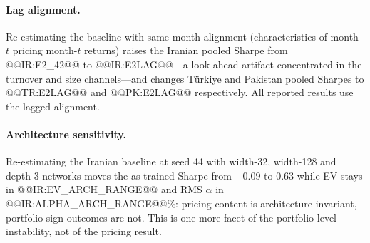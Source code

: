 \documentclass[12pt]{article}
\begin{document}
\paragraph{Lag alignment.} Re-estimating the baseline with same-month alignment (characteristics of month $t$ pricing month-$t$ returns) raises the Iranian pooled Sharpe from @@IR:E2_42@@ to @@IR:E2LAG@@---a look-ahead artifact concentrated in the turnover and size channels---and changes T\"urkiye and Pakistan pooled Sharpes to @@TR:E2LAG@@ and @@PK:E2LAG@@ respectively. All reported results use the lagged alignment.

\paragraph{Architecture sensitivity.} Re-estimating the Iranian baseline at seed 44 with width-32, width-128 and depth-3 networks moves the as-trained Sharpe from $-0.09$ to $0.63$ while EV stays in @@IR:EV_ARCH_RANGE@@ and RMS $\alpha$ in @@IR:ALPHA_ARCH_RANGE@@\%: pricing content is architecture-invariant, portfolio sign outcomes are not. This is one more facet of the portfolio-level instability, not of the pricing result.
\end{document}
